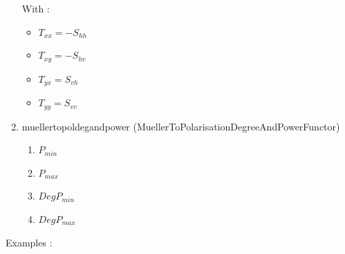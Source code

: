 \begin{enumerate}
With :
\begin{itemize}
\item $ T_{xx} = -S_{hh} $ 
\item $ T_{xy} = -S_{hv} $ 
\item $ T_{yx} = S_{vh} $ 
\item $ T_{yy} = S_{vv} $ 
\end{itemize}

 
\item muellertopoldegandpower (MuellerToPolarisationDegreeAndPowerFunctor)
\begin{enumerate}
\item $ P_{min} $ 
\item $ P_{max} $ 
\item $ DegP_{min} $ 
\item $ DegP_{max} $
\end{enumerate}

\end{enumerate}

Examples :

